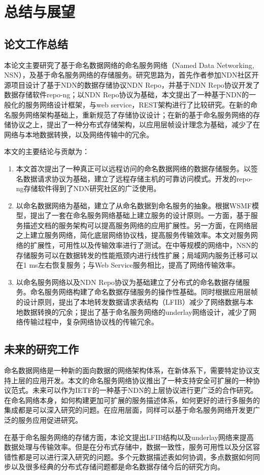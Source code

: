 

\chapter{总结与展望}

\section{论文工作总结}
本论文主要研究了基于命名数据网络的命名服务网络（Named Data Networking, NSN），及基于命名服务网络的存储服务。研究思路为，首先作者参加NDN社区开源项目设计了基于NDN的数据存储协议NDN Repo，并基于NDN Repo协议开发了数据存储软件repo-ng；以NDN Repo协议为基础，本文提出了一种基于NDN的一般化的服务网络设计框架，与web service，REST架构进行了比较研究。在新的命名服务网络架构基础上，重新规范了存储协议设计；在新的基于命名服务网络的存储协议之上，提出了一种分布式存储架构，以应用层帧设计理念为基础，减少了在网络与本地数据转换，以及网络传输中的冗余。

本文的主要结论与贡献为：
\begin{enumerate}
\item 本文首次提出了一种真正可以远程访问的命名数据网络的数据存储服务。以签名数据请求协议为基础，建立了远程存储主机的可靠访问模式。开发的repo-ng存储软件得到了NDN研究社区的广泛使用。
\item 以命名数据网络为基础，建立了从命名数据到命名服务的抽象。根据WSMF模型，提出了一套在命名服务网络基础上建立服务的设计原则。一方面，基于服务描述文档的服务架构可以提高服务网络的应用扩展性。另一方面，在网络层之上建立服务网络，简化底层网络协议栈，提高服务传输效率。本文对服务网络的扩展性，可用性以及传输效率进行了测试。在中等规模的网络中，NSN的存储服务可以在数据转发的性能瓶颈内进行线性扩展；局域网内服务迁移可以在1 ms左右恢复服务；与Web Service服务相比，提高了网络传输效率。
\item 以命名服务网络以及NDN Repo协议为基础建立了分布式的命名数据存储服务。命名服务网络构建了命名数据存储服务的操作性基础。同时根据应用层帧的设计原则，提出了本地转发数据请求表结构（LFIB）减少了网络数据与本地数据转换的冗余；提出了基于命名服务网络的underlay网络设计，减少了网络传输过程中，复杂网络协议栈的传输冗余。
\end{enumerate}

\section{未来的研究工作}
命名数据网络是一种新的面向数据的网络架构体系，在新体系下，需要特定协议支持上层的应用开发。本文的命名服务网络协议推出了一种支持安全可扩展的一种协议范式。未来可以作为IETF的一种基于NDN的上层协议进行更广泛的合作研究。在命名网络本身，如何构建更加可扩展的服务描述体系，如何更好的进行多服务的集成都是可以深入研究的问题。在应用层面，同样可以基于命名服务网络开发更广泛的服务应用促进研究。

在基于命名服务网络的存储方面，本论文提出LFIB结构以及underlay网络来提高数据处理与传输效率。但是在分布式存储中，数据一致性，服务可用性以及分区容错性都是可以进行深入研究的问题。多个元数据描述表如何协调，多点数据如何同步以及很多经典的分布式存储问题都是命名数据存储今后的研究方向。